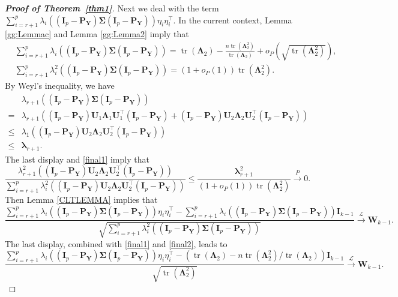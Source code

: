 \documentclass[10pt]{book}
\theoremstyle{definition}
\DeclareMathOperator{\mytr}{tr}
\newcommand{\bP}{\mathbf{P}}
\newcommand{\bY}{\mathbf{Y}}
\newcommand{\bI}{\mathbf{I}}
\newcommand{\bU}{\mathbf{U}}
\newcommand{\bW}{\mathbf{W}}
\newcommand{\bfsym}[1]{\ensuremath{\boldsymbol{#1}}}
\def\blambda {\bfsym {\lambda}}
\def\bLambda {\bfsym {\Lambda}}
\def\bSigma {\bfsym {\Sigma}}
\begin{document}
\begin{proof}[\textbf{Proof of Theorem~\ref{thm1}}]
    Next we deal with the term
    $
\sum_{i=r+1}^p \lambda_i ( (\bI_p-\bP_{\bY})\bSigma (\bI_p-\bP_{\bY}))\eta_i \eta_i^\top
$.
In the current context, Lemma \ref{gg:Lemmac} and Lemma \ref{gg:Lemma2} imply that
\begin{align}
        &\sum_{i=r+1}^{p}\lambda_i\left(
         (\bI_p -\bP_\bY)\bSigma (\bI_p- \bP_{\bY})
    \right)
    =\mytr(\bLambda_2)-\frac{n\mytr(\bLambda_2^2)}{\mytr(\bLambda_2)}
    +
    o_P\left(
        \sqrt{\mytr(\bLambda_2^2)}
    \right),
    \label{final1}
    \\
        &\sum_{i=r+1}^{p}\lambda_i^2\left(
         (\bI_p -\bP_\bY)\bSigma (\bI_p- \bP_{\bY})
    \right)
        =
        (1+o_P(1))\mytr(\bLambda_2^2).
        \label{final2}
\end{align}
By Weyl's inequality, we have
\begin{equation*}
    \begin{split}
    &\lambda_{r+1} ( (\bI_p-\bP_{\bY})\bSigma (\bI_p-\bP_{\bY}))
    \\
    =&
    \lambda_{r+1} \left( (\bI_p-\bP_{\bY})\bU_1 \bLambda_1 \bU_1^\top (\bI_p-\bP_{\bY})
        +
     (\bI_p-\bP_{\bY})\bU_2 \bLambda_2 \bU_2^\top (\bI_p-\bP_{\bY})\right)
     \\
     \leq&
     \lambda_{1}\left((\bI_p-\bP_{\bY})\bU_2 \bLambda_2 \bU_2^\top (\bI_p-\bP_{\bY})\right)
     \\
     \leq& \blambda_{r+1}.
    \end{split}
\end{equation*}
The last display and \eqref{final1} imply that
$$
\frac{\lambda_{r+1}^2\left((\bI_p-\bP_{\bY})\bU_2 \bLambda_2 \bU_2^\top (\bI_p-\bP_{\bY})\right)}{\sum_{i=r+1}^p\lambda_{i}^2\left((\bI_p-\bP_{\bY})\bU_2 \bLambda_2 \bU_2^\top (\bI_p-\bP_{\bY})\right)}
\leq
\frac{
    \blambda_{r+1}^2
}{
    (1+o_P(1))\mytr(\bLambda_2^2)
}
\xrightarrow{P} 0.
$$
Then Lemma \ref{CLTLEMMA} implies that
\begin{equation*}
    \frac{
\sum_{i=r+1}^p \lambda_i ( (\bI_p-\bP_{\bY})\bSigma (\bI_p-\bP_{\bY}))\eta_i \eta_i^\top
-
\sum_{i=r+1}^p \lambda_i ( (\bI_p-\bP_{\bY})\bSigma (\bI_p-\bP_{\bY})) \bI_{k-1}
}{
    \sqrt{\sum_{i=r+1}^p \lambda_i^2 ( (\bI_p-\bP_{\bY})\bSigma (\bI_p-\bP_{\bY}))}
}
\xrightarrow{\mathcal{L}} \bW_{k-1}.
\end{equation*}
The last display,  combined with \eqref{final1} and \eqref{final2}, leads to
\begin{equation}\label{lushang2}
    \frac{
\sum_{i=r+1}^p \lambda_i ( (\bI_p-\bP_{\bY})\bSigma (\bI_p-\bP_{\bY}))\eta_i \eta_i^\top
-
\left(\mytr(\bLambda_2)-n\mytr(\bLambda_2^2)/\mytr(\bLambda_2)\right)\bI_{k-1}
}{
    \sqrt{\mytr(\bLambda_2^2)}
}
\xrightarrow{\mathcal{L}} \bW_{k-1}.
\end{equation}


\end{proof}
\end{document}
